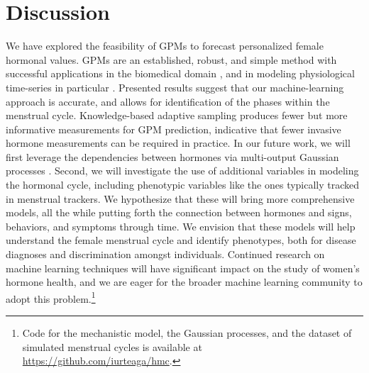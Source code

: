 \documentclass{article}
\begin{document}
\vspace*{-0.25cm}
\section{Discussion}
\vspace*{-0.5em}
We have explored the feasibility of GPMs to forecast personalized female
hormonal values. GPMs are an established, robust, and simple method with
successful applications in the biomedical domain
\citep{ip-Duerichen2014,ip-Pimentel2013}, and in modeling physiological
time-series in particular \citep{j-Duerichen2015,j-Cheng2017}. Presented
results suggest that our machine-learning approach is accurate, and allows for
identification of the phases within the menstrual cycle. Knowledge-based
adaptive sampling produces fewer but more informative measurements for GPM
prediction, indicative that fewer invasive hormone measurements can be required
in practice. In our future work, we will first leverage the dependencies
between hormones via multi-output Gaussian processes
\cite{ic-Boyle2005,ic-Alvarez2009,ic-Bonilla2008}. Second, we will investigate
the use of additional variables in modeling the hormonal cycle, including
phenotypic variables like the ones typically tracked in menstrual trackers. We
hypothesize that these will bring more comprehensive models, all the while
putting forth the connection between hormones and signs, behaviors, and
symptoms through time. We envision that these models will help understand the
female menstrual cycle and identify phenotypes, both for disease diagnoses and
discrimination amongst individuals. Continued research on machine learning
techniques will have significant impact on the study of women's hormone
health, and we are eager for the broader machine learning community to adopt
this problem.\footnote{Code for the mechanistic model, the Gaussian processes,
  and the dataset of simulated menstrual cycles is available at \url{https://github.com/iurteaga/hmc}.} 

%



\end{document}
